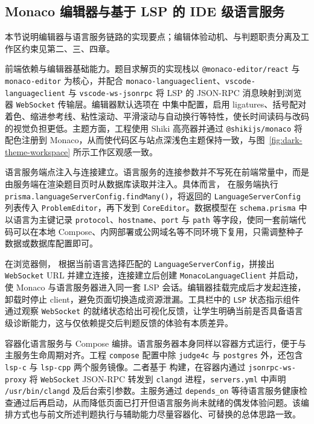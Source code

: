 \subsection{Monaco 编辑器与基于 LSP 的 IDE 级语言服务}

本节说明编辑器与语言服务链路的实现要点；编辑体验动机、与判题职责分离及工作区约束见第二、三、四章。

\noindent 前端依赖与编辑器基础能力。题目求解页的实现栈以 \texttt{@monaco-editor/react} 与 \texttt{monaco-editor} 为核心，并配合 \texttt{monaco-languageclient}、\texttt{vscode-languageclient} 与 \texttt{vscode-ws-jsonrpc} 将 LSP 的 JSON-RPC 消息映射到浏览器 \texttt{WebSocket} 传输层\cite{monacolanguageclientrepo}。编辑器默认选项在  中集中配置，启用 ligatures、括号配对着色、缩进参考线、粘性滚动、平滑滚动与自动换行等特性，使长时间读码与改码的视觉负担更低。主题方面，工程使用 Shiki 高亮器并通过 \texttt{@shikijs/monaco} 将配色注册到 Monaco，从而使代码区与站点深浅色主题保持一致，与图~\ref{fig:dark-theme-workspace} 所示工作区观感一致。

\noindent 语言服务端点注入与连接建立。语言服务的连接参数并不写死在前端常量中，而是由服务端在渲染题目页时从数据库读取并注入。具体而言， 在服务端执行 \texttt{prisma.languageServerConfig.findMany()}，将返回的 \texttt{LanguageServerConfig} 列表传入 \texttt{ProblemEditor}，再下发到 \texttt{CoreEditor}\cite{prismadocs}。数据模型在 \texttt{schema.prisma} 中以语言为主键记录 \texttt{protocol}、\texttt{hostname}、\texttt{port} 与 \texttt{path} 等字段，使同一套前端代码可以在本地 Compose、内网部署或公网域名等不同环境下复用，只需调整种子数据或数据库配置即可。

在浏览器侧， 根据当前语言选择匹配的 \texttt{LanguageServerConfig}，拼接出 \texttt{WebSocket} URL 并建立连接，连接建立后创建 \texttt{MonacoLanguageClient} 并启动，使 Monaco 与语言服务器进入同一套 LSP 会话。编辑器挂载完成后才发起连接，卸载时停止 client，避免页面切换造成资源泄漏。工具栏中的 \texttt{LSP} 状态指示组件  通过观察 \texttt{WebSocket} 的就绪状态给出可视化反馈，让学生明确当前是否具备语言级诊断能力，这与仅依赖提交后判题反馈的体验有本质差异。

\noindent 容器化语言服务与 Compose 编排。语言服务器本身同样以容器方式运行，便于与主服务生命周期对齐。工程 \texttt{compose} 配置中除 \texttt{judge4c} 与 \texttt{postgres} 外，还包含 \texttt{lsp-c} 与 \texttt{lsp-cpp} 两个服务镜像。二者基于  构建，在容器内通过 \texttt{jsonrpc-ws-proxy} 将 \texttt{WebSocket} JSON-RPC 转发到 \texttt{clangd} 进程，\texttt{servers.yml} 中声明 \texttt{/usr/bin/clangd} 及后台索引参数。主服务通过 \texttt{depends\_on} 等待语言服务健康检查通过后再启动，从而降低页面已打开但语言服务尚未就绪的偶发体验问题。该编排方式也与前文所述判题执行与辅助能力尽量容器化、可替换的总体思路一致\cite{dockerdocs,kubernetesdocs}。

